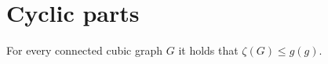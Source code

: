 \documentclass[12pt, twoside]{book}
\begin{document}
%
%
%
%
%
%
%

\section{Cyclic parts}\label{sec:cyclic-parts}

\begin{proposition}\label{prop:cyclic-con-less-than-girth}
	For every connected cubic graph $G$ it holds that $\zeta(G)\leq g(g)$.
\end{proposition}
\end{document}
